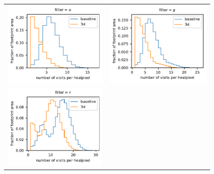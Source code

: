 \documentclass[preprintm,linenumbers]{aastex631}
\begin{document}
  \begin{figure}
			\centering
			\begin{tabular}{@{}c@{}c@{}}
				\includegraphics{results/histograms/hist_first_year_one_snap_v4_0_10yrs_db_noDD_noTwi_CountMetric_doAllTemplateMetrics_reduceCount_u_3_noDD_noTwi.pdf} &
				 \includegraphics{results/histograms/hist_first_year_one_snap_v4_0_10yrs_db_noDD_noTwi_CountMetric_doAllTemplateMetrics_reduceCount_g_3_noDD_noTwi.pdf} \\
				 \includegraphics{results/histograms/hist_first_year_one_snap_v4_0_10yrs_db_noDD_noTwi_CountMetric_doAllTemplateMetrics_reduceCount_r_3_noDD_noTwi.pdf} &

\end{tabular}
\end{figure}
\end{document}
